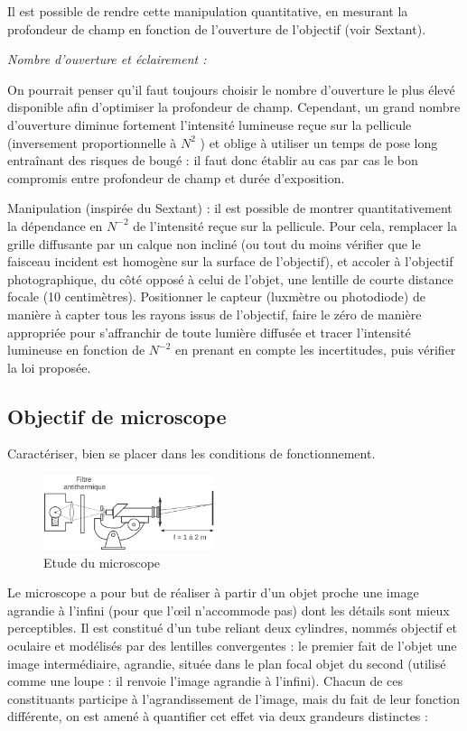 \documentclass{article}%
\begin{document}
Il est possible de rendre cette manipulation quantitative, en mesurant la profondeur de champ en fonction de l'ouverture de l'objectif (voir Sextant).

\textit{Nombre d'ouverture et éclairement :}

On pourrait penser qu'il faut toujours choisir le nombre d'ouverture le plus élevé disponible afin d'optimiser la profondeur de champ. Cependant, un grand nombre d'ouverture diminue fortement l'intensité lumineuse reçue sur la pellicule (inversement proportionnelle à $N^2$ ) et oblige à utiliser un temps de pose long entraînant des risques de bougé : il faut donc établir au cas par cas le bon compromis entre profondeur de champ et durée d'exposition.

Manipulation (inspirée du Sextant) : il est possible de montrer quantitativement la dépendance en $N^{-2}$ de l'intensité reçue sur la pellicule. Pour cela, remplacer la grille diffusante par un calque non incliné (ou tout du moins vérifier que le faisceau incident est homogène sur la surface de l'objectif), et accoler à l'objectif photographique, du côté opposé à celui de l'objet, une lentille de courte distance focale (10 centimètres). Positionner le capteur (luxmètre ou photodiode) de manière à capter tous les rayons issus de l'objectif, faire le zéro de manière appropriée pour s'affranchir de toute lumière diffusée et tracer l'intensité lumineuse en fonction de $N^{-2}$ en prenant en compte les incertitudes, puis vérifier la loi proposée. 

\subsection{Objectif de microscope}
Caractériser, bien se placer dans les conditions de fonctionnement.

\begin{figure}
	\centerline{\includegraphics[width=5cm]{images-exp/InstrumentsMicroscope.png}}
	\caption{Etude du microscope}
\end{figure}
Le microscope a pour but de réaliser à partir d'un objet proche une image agrandie à l'infini (pour que l’œil n’accommode pas) dont les détails sont mieux perceptibles. Il est constitué d'un tube reliant deux cylindres, nommés objectif et oculaire et modélisés par des lentilles convergentes : le premier fait de l'objet une image intermédiaire, agrandie, située dans le plan focal objet du second (utilisé comme une loupe : il renvoie l'image agrandie à l'infini). Chacun de ces constituants participe à l'agrandissement de l'image, mais du fait de leur fonction différente, on est amené à quantifier cet effet via deux grandeurs distinctes :
\end{document}

